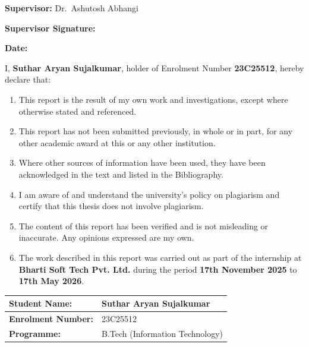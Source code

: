 \documentclass[
  12pt,
  a4paperpaper,
]{report}
\begin{document}
\vspace{8pt}

\noindent\textbf{Supervisor:} Dr.~Ashutosh Abhangi

\noindent
\begin{minipage}[t]{0.55\textwidth}
\textbf{Supervisor Signature:} \underline{\hspace{2.0in}}
\end{minipage}\hfill
\begin{minipage}[t]{0.4\textwidth}
\textbf{Date:} \underline{\hspace{1.5in}}
\end{minipage}

\vspace*{\fill}
\clearpage
\vspace*{\fill}
\label{declaration-of-originality}
\vspace{12pt}


I, \textbf{Suthar Aryan Sujalkumar}, holder of Enrolment Number
\textbf{23C25512}, hereby declare that:

\begin{enumerate}
\def\labelenumi{\arabic{enumi}.}
\item
  This report is the result of my own work and investigations, except
  where otherwise stated and referenced.
\item
  This report has not been submitted previously, in whole or in part,
  for any other academic award at this or any other institution.
\item
  Where other sources of information have been used, they have been
  acknowledged in the text and listed in the Bibliography.
\item
  I am aware of and understand the university's policy on plagiarism and
  certify that this thesis does not involve plagiarism.
\item
  The content of this report has been verified and is not misleading or
  inaccurate. Any opinions expressed are my own.
\item
  The work described in this report was carried out as part of the
  internship at \textbf{Bharti Soft Tech Pvt. Ltd.} during the period
  \textbf{17th November 2025} to \textbf{17th May 2026}.
\end{enumerate}


\noindent\begin{tabularx}{\textwidth}{|p{5cm}|X|}
\hline
\textbf{Student Name:}     & Suthar Aryan Sujalkumar \\[3pt]
\hline
\textbf{Enrolment Number:} & 23C25512 \\[3pt]
\hline
\textbf{Programme:}        & B.Tech (Information Technology) \\
\hline
\end{tabularx}
\end{document}
